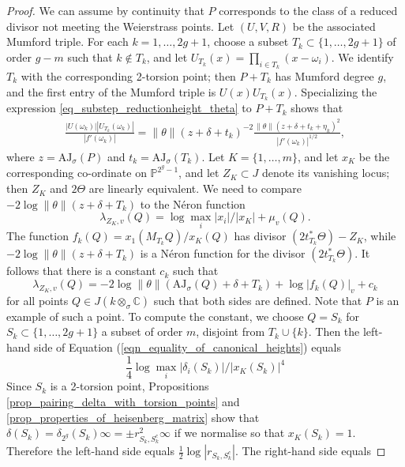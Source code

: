 \documentclass{article} %
\numberwithin{equation}{section}
\renewcommand{\P}{\mathbb{P}}
\newcommand{\bC}{\mathbb{C}}
\begin{document}
\begin{proof}
   We can assume by continuity that $P$ corresponds to the class of a reduced divisor not meeting the Weierstrass points. 
   Let $(U, V, R)$ be the associated Mumford triple. For each $k = 1, \dots, 2g+1$, choose a subset $T_k \subset \{ 1, \dots, 2g+1 \}$ of order $g-m$ such that $k \not\in T_k$, and let $U_{T_k}(x) = \prod_{i \in T_k} ( x - \omega_i )$. We identify $T_k$ with the corresponding 2-torsion point; then $P + T_k$ has Mumford degree $g$, and the first entry of the Mumford triple is $U(x) U_{T_k}(x)$. 
   Specializing the expression \eqref{eq_substep_reductionheight_theta} to $P + T_k$ shows that
   \begin{align}\label{eq_proof_reductionheight_nongeneric1}
     \frac{|U(\omega_k)| |U_{T_k}(\omega_k) |}{|f'(\omega_k)|} = \| \theta\|(z + \delta + t_k)^{-2} \frac{\| \theta\|(z + \delta + t_k + \eta_k)^2}{|f'(\omega_k)|^{1/2}},
     \end{align}
    where $z = \mathrm{AJ}_\sigma(P)$ and $t_k=\mathrm{AJ}_{\sigma}(T_k)$. Let $K = \{ 1, \dots, m \}$, and let $x_K$ be the corresponding co-ordinate on $\P^{2^g-1}$, and let $Z_K \subset J$ denote its vanishing locus; then $Z_K$ and $2 \Theta$ are linearly equivalent. We need to compare $- 2 \log \| \theta\|(z + \delta + T_k)$ to the N\'eron function
    \[ \lambda_{Z_K, v}(Q) = \log \max_i |x_i| / |x_K| + \mu_v(Q). \]
    The function $f_k(Q) = x_1(M_{T_k} Q) / x_K(Q)$ has divisor $(2 t_{T_k}^\ast \Theta) - Z_K$, while $- 2 \log\| \theta\|(z + \delta + T_k)$ is a N\'eron function for the divisor $(2 t_{T_k}^\ast \Theta)$. It follows that there is a constant $c_k$ such that \begin{equation}\label{eqn_equality_of_canonical_heights} \lambda_{Z_K, v}(Q) = -2 \log \| \theta \|(\mathrm{AJ}_\sigma(Q) + \delta + T_k)  + \log |f_k(Q)|_v + c_k \end{equation}
    for all points $Q \in J(k \otimes_\sigma \bC)$ such that both sides are defined. Note that $P$ is an example of such a point. To compute the constant, we choose $Q = S_k$ for $S_k \subset \{ 1, \dots, 2g+1\}$ a subset of order $m$, disjoint from $T_k \cup \{ k \}$. Then the left-hand side of Equation (\ref{eqn_equality_of_canonical_heights}) equals
    \[ \frac{1}{4} \log \max_i | \delta_i(S_k) | / |x_K(S_k)|^4 \]
    Since $S_k$ is a 2-torsion point, Propositions \ref{prop_pairing_delta_with_torsion_points} and \ref{prop_properties_of_heisenberg_matrix} show that $\delta(S_k) = \delta_{2^g}(S_k) \infty = \pm r_{S_k, S_k^c}^2 \infty$ if we normalise so that $x_K(S_k) = 1$. Therefore the left-hand side equals $\frac{1}{2} \log |r_{S_k, S_k^c}|$. The right-hand side equals

\end{proof}
\end{document}
